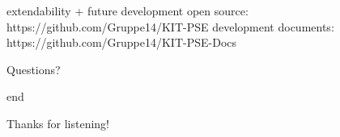 \documentclass[xcolor=dvipsnames]{beamer}
\begin{document}
\begin{frame}{extendability + future development}
	open source: https://github.com/Gruppe14/KIT-PSE
	\newline development documents: https://github.com/Gruppe14/KIT-PSE-Docs
\end{frame}

\begin{frame}{}
	\begin{center}
	\huge{Questions?}
	\end{center}
\end{frame}  

\begin{frame}{end}

\begin{center}
\huge{Thanks for listening!}
\end{center}


\end{frame}  


\end{document}
